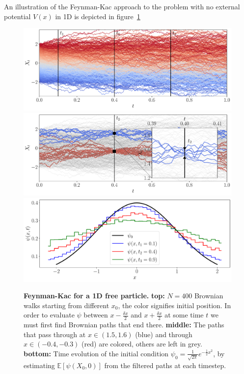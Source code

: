 An illustration of the Feynman-Kac approach to the problem with no external potential $V(x)$ in 1D is depicted in figure~\ref{fig:fk_1d_example}
\begin{figure}[h]
	\centering
	\subfloat
	{\includegraphics[width = \linewidth]{Chapter2/Figs/Raster/fkac_vs_fplanck_top.pdf}} \\
	\subfloat
	{\includegraphics[width = \linewidth]{Chapter2/Figs/Raster/fkac_vs_fplanck_mid1.pdf}} \\
	\subfloat
	{\includegraphics[width = \linewidth]{Chapter2/Figs/Raster/fkac_vs_fplanck_bottom.pdf}}
	
	\caption[Feynman-Kac for a 1D free particle]{\textbf{Feynman-Kac for a 1D free particle.} \textbf{top:} $N=400$ Brownian walks starting from different $x_0$, the color signifies initial position. In order to evaluate $\psi$ between $x-\frac{\delta x}{2}$ and $x+\frac{\delta x}{2}$ at some time $t$ we must first find Brownian paths that end there. \textbf{middle:} The paths that pass through at $x \in (1.5, 1.6)$ (blue) and through $x \in (-0.4,-0.3)$ (red) are colored, others are left in grey. \textbf{bottom:} Time evolution of the initial condition $\psi_{0} = \frac{1}{\sqrt{2 \pi}} e^{-\frac{1}{2} x^{2}}$, by estimating ${\mathbb{E}}\left[\psi\left(X_{0}, 0\right)\right]$ from the filtered paths at each timestep.}
	\label{fig:fk_1d_example}
\end{figure}


